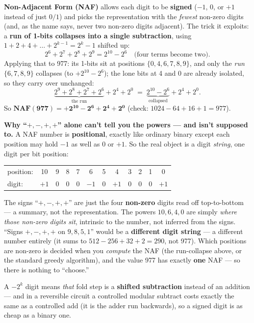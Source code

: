 \documentclass[11pt,a4paper]{article}
\begin{document}
\textbf{Non-Adjacent Form (NAF)} allows each digit to be \textbf{signed} ($-1$, $0$, or $+1$ instead
of just $0/1$) and picks the representation with the \emph{fewest} non-zero digits (and, as the name
says, never two non-zero digits adjacent). The trick it exploits: a \textbf{run of 1-bits collapses
into a single subtraction}, using $1 + 2 + 4 + \dots + 2^{k-1} = 2^k - 1$ shifted up:
\[
  2^6 + 2^7 + 2^8 + 2^9 = 2^{10} - 2^6 \quad\text{(four terms become two)}.
\]
Applying that to 977: its 1-bits sit at positions $\{0,4,6,7,8,9\}$, and only the \emph{run}
$\{6,7,8,9\}$ collapses (to $+2^{10}-2^6$); the lone bits at 4 and 0 are already isolated, so they
carry over unchanged:
\[
  \underbrace{2^9 + 2^8 + 2^7 + 2^6}_{\text{the run}} + 2^4 + 2^0
  \;=\; \underbrace{2^{10} - 2^6}_{\text{collapsed}} + 2^4 + 2^0 .
\]
So $\mathbf{NAF(977) = +2^{10} - 2^6 + 2^4 + 2^0}$ (check: $1024 - 64 + 16 + 1 = 977$).

\textbf{Why ``$+,-,+,+$'' alone can't tell you the powers --- and isn't supposed to.} A NAF number is
\textbf{positional}, exactly like ordinary binary except each position may hold $-1$ as well as $0$ or
$+1$. So the real object is a digit \emph{string}, one digit per bit position:
\begin{center}
\begin{tabular}{l ccccccccccc}
position: & 10 & 9 & 8 & 7 & 6 & 5 & 4 & 3 & 2 & 1 & 0 \\
digit:    & $+1$ & 0 & 0 & 0 & $-1$ & 0 & $+1$ & 0 & 0 & 0 & $+1$ \\
\end{tabular}
\end{center}
The signs ``$+,-,+,+$'' are just the four \textbf{non-zero} digits read off top-to-bottom --- a
summary, not the representation. The powers $10, 6, 4, 0$ are simply \emph{where those non-zero digits
sit}, intrinsic to the number, not inferred from the signs. ``Signs $+,-,+,+$ on $9,8,5,1$'' would be
a \textbf{different digit string} --- a different number entirely (it sums to $512 - 256 + 32 + 2 =
290$, not 977). Which positions are non-zero is decided when you \emph{compute} the NAF (the
run-collapse above, or the standard greedy algorithm), and the value 977 has exactly \textbf{one} NAF
--- so there is nothing to ``choose.''

A $-2^k$ digit means \emph{that} fold step is a \textbf{shifted subtraction} instead of an addition ---
and in a reversible circuit a controlled modular subtract costs exactly the same as a controlled add
(it is the adder run backwards), so a signed digit is as cheap as a binary one.
\end{document}
